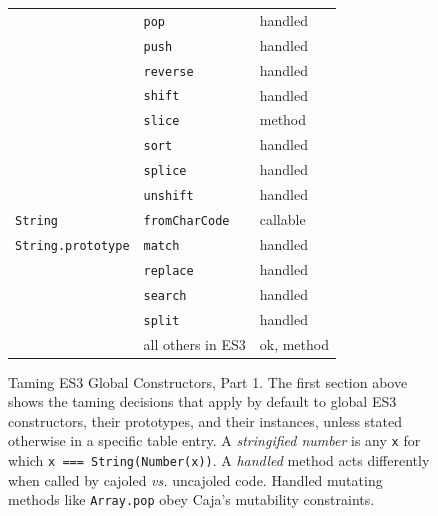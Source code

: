 \documentclass[letterpaper,twocolumn,10pt]{article}
\newcommand{\code}[1]{{\tt {#1}}}              %
\begin{document}
\begin{figure}
\begin{tabular}{lll}
                               & \code{pop}                  & handled \\
                               & \code{push}                 & handled \\
                               & \code{reverse}              & handled \\
                               & \code{shift}                & handled \\
                               & \code{slice}                & method \\
                               & \code{sort}                 & handled \\
                               & \code{splice}               & handled \\
                               & \code{unshift}              & handled \\
  \hline
  \code{String}                & \code{fromCharCode}         & callable \\
  \code{String.prototype}      & \code{match}                & handled \\
                               & \code{replace}              & handled \\
                               & \code{search}               & handled \\
                               & \code{split}                & handled \\
                               &           all others in ES3 & ok, method \\
\end{tabular}

\caption[Taming ES3 Global Constructors, Part 1.]{Taming ES3 Global Constructors, Part 1. The first section above 
shows the taming decisions that apply by default to global ES3 constructors, their prototypes, and their instances, 
unless stated otherwise in a specific table entry. A \emph{stringified number} is any \code{x} for which \code{x === 
String(Number(x))}. A \emph{handled} method acts differently when called by cajoled \emph{vs.} uncajoled code. 
Handled mutating methods like \code{Array.pop} obey Caja's mutability constraints.}
\label{tab:taming-es3-1}
\end{figure}
\end{document}
